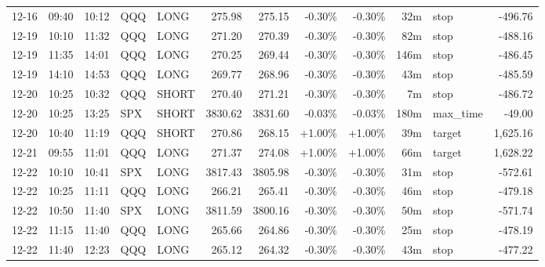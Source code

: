 \documentclass[11pt,a4paper]{article}
\begin{document}
\begin{center}
\begin{longtable}{>{\color{txtmain}}l l l l l r r r r r >{\color{txtmain}}l r}
12-16 & 09:40 & 10:12 & QQQ & LONG & 275.98 & 275.15 & \textcolor{lossred}{-0.30\%} & \textcolor{lossred}{-0.30\%} & 32m & stop & \textcolor{lossred}{-496.76} \\
12-19 & 10:10 & 11:32 & QQQ & LONG & 271.20 & 270.39 & \textcolor{lossred}{-0.30\%} & \textcolor{lossred}{-0.30\%} & 82m & stop & \textcolor{lossred}{-488.16} \\
12-19 & 11:35 & 14:01 & QQQ & LONG & 270.25 & 269.44 & \textcolor{lossred}{-0.30\%} & \textcolor{lossred}{-0.30\%} & 146m & stop & \textcolor{lossred}{-486.45} \\
12-19 & 14:10 & 14:53 & QQQ & LONG & 269.77 & 268.96 & \textcolor{lossred}{-0.30\%} & \textcolor{lossred}{-0.30\%} & 43m & stop & \textcolor{lossred}{-485.59} \\
12-20 & 10:25 & 10:32 & QQQ & SHORT & 270.40 & 271.21 & \textcolor{lossred}{-0.30\%} & \textcolor{lossred}{-0.30\%} & 7m & stop & \textcolor{lossred}{-486.72} \\
12-20 & 10:25 & 13:25 & SPX & SHORT & 3830.62 & 3831.60 & \textcolor{lossred}{-0.03\%} & \textcolor{lossred}{-0.03\%} & 180m & max\_time & \textcolor{lossred}{-49.00} \\
12-20 & 10:40 & 11:19 & QQQ & SHORT & 270.86 & 268.15 & \textcolor{wingreen}{+1.00\%} & \textcolor{wingreen}{+1.00\%} & 39m & target & \textcolor{wingreen}{1,625.16} \\
12-21 & 09:55 & 11:01 & QQQ & LONG & 271.37 & 274.08 & \textcolor{wingreen}{+1.00\%} & \textcolor{wingreen}{+1.00\%} & 66m & target & \textcolor{wingreen}{1,628.22} \\
12-22 & 10:10 & 10:41 & SPX & LONG & 3817.43 & 3805.98 & \textcolor{lossred}{-0.30\%} & \textcolor{lossred}{-0.30\%} & 31m & stop & \textcolor{lossred}{-572.61} \\
12-22 & 10:25 & 11:11 & QQQ & LONG & 266.21 & 265.41 & \textcolor{lossred}{-0.30\%} & \textcolor{lossred}{-0.30\%} & 46m & stop & \textcolor{lossred}{-479.18} \\
12-22 & 10:50 & 11:40 & SPX & LONG & 3811.59 & 3800.16 & \textcolor{lossred}{-0.30\%} & \textcolor{lossred}{-0.30\%} & 50m & stop & \textcolor{lossred}{-571.74} \\
12-22 & 11:15 & 11:40 & QQQ & LONG & 265.66 & 264.86 & \textcolor{lossred}{-0.30\%} & \textcolor{lossred}{-0.30\%} & 25m & stop & \textcolor{lossred}{-478.19} \\
12-22 & 11:40 & 12:23 & QQQ & LONG & 265.12 & 264.32 & \textcolor{lossred}{-0.30\%} & \textcolor{lossred}{-0.30\%} & 43m & stop & \textcolor{lossred}{-477.22} \\

\end{longtable}
\end{center}
\end{document}
